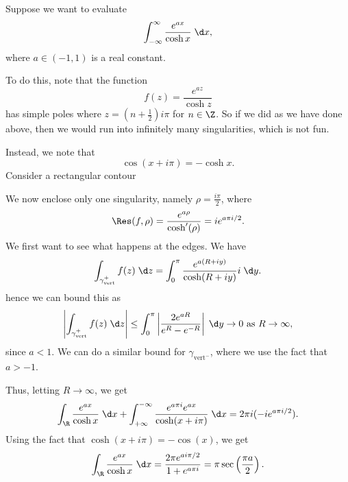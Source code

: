 \documentclass[a4paper]{article}
\begin{document}
\begin{eg}
  Suppose we want to evaluate
  \[
    \int_{-\infty}^\infty \frac{e^{ax}}{\cosh x}\;\d x,
  \]
  where $a \in (-1, 1)$ is a real constant.

  To do this, note that the function
  \[
    f(z) = \frac{e^{az}}{\cosh z}
  \]
  has simple poles where $z = \left(n + \frac{1}{2}\right) i \pi$ for $n \in \Z$. So if we did as we have done above, then we would run into infinitely many singularities, which is not fun.

  Instead, we note that
  \[
    \cos (x + i\pi) =- \cosh x.
  \]
  Consider a rectangular contour
  \begin{center}
  \end{center}
  We now enclose only one singularity, namely $\rho = \frac{i \pi }{2}$, where
  \[
    \Res(f, \rho) = \frac{e^{a \rho}}{\cosh' (\rho)} = ie^{a \pi i/2}.
  \]
  We first want to see what happens at the edges. We have
  \[
    \int_{\gamma_{\mathrm{vert}}^+} f(z)\;\d z = \int_0^\pi \frac{e^{a(R + iy)}}{\cosh (R + iy)} i \;\d y.
  \]
  hence we can bound this as
  \[
    \left|\int_{\gamma_{\mathrm{vert}}^+} f(z)\;\d z\right| \leq \int_0^\pi \left|\frac{2 e^{aR}}{e^R - e^{-R}}\right| \;\d y \to 0\text{ as }R \to \infty,
  \]
  since $a < 1$. We can do a similar bound for $\gamma_{\mathrm{vert}^-}$, where we use the fact that $a > -1$.

  Thus, letting $R \to \infty$, we get
  \[
    \int_{\R} \frac{e^{ax}}{\cosh x} \;\d x + \int_{+\infty}^{-\infty} \frac{e^{a \pi i} e^{ax}}{\cosh(x + i \pi)} \;\d x= 2\pi i (-i e^{a \pi i/2}).
  \]
  Using the fact that $\cosh(x + i\pi) = -\cos(x)$, we get
  \[
    \int_{\R} \frac{e^{ax}}{\cosh x} \;\d x = \frac{2 \pi e^{a i \pi/2}}{1 + e^{a \pi i}}= \pi \sec\left(\frac{\pi a}{2}\right).
  \]
\end{eg}
\end{document}
